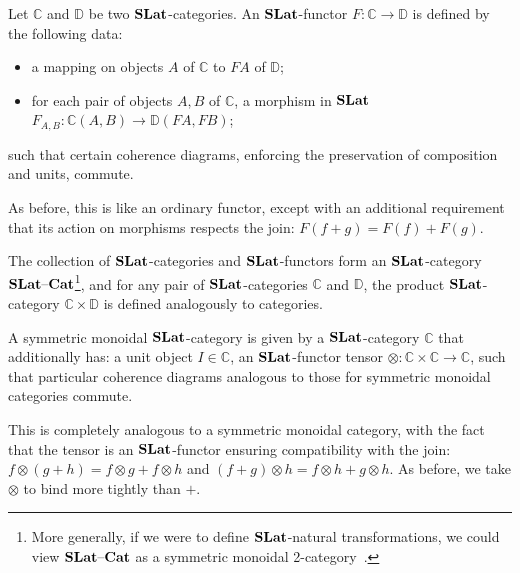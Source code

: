 \begin{definition}
	Let $\mathbb{C}$ and $\mathbb{D}$ be two $\mathbf{SLat}$-categories.
	An $\mathbf{SLat}$-functor $F\colon \mathbb{C} \to \mathbb{D}$ is defined by the following data:
	\begin{itemize}
		\item a mapping on objects $A$ of $\mathbb{C}$ to $F A$ of $\mathbb{D}$;
		\item for each pair of objects $A, B$ of $\mathbb{C}$, a morphism in $\mathbf{SLat}$ $F_{A,B}\colon \mathbb{C}(A,B) \to \mathbb{D}(FA,FB)$;
	\end{itemize}
	such that certain coherence diagrams, enforcing the preservation of composition and units, commute.
\end{definition}
As before, this is like an ordinary functor, except with an additional requirement that its action on morphisms respects the join: $F(f + g) = F(f) + F(g)$.

The collection of $\mathbf{SLat}$-categories and $\mathbf{SLat}$-functors form an $\mathbf{SLat}$-category $\mathbf{SLat}\text{--}\mathbf{Cat}$\footnote{More generally, if we were to define $\mathbf{SLat}$-natural transformations, we could view $\mathbf{SLat}\text{--}\mathbf{Cat}$ as a symmetric monoidal 2-category~\cite{Kelly2022BASICCO}.}, and for any pair of $\mathbf{SLat}$-categories $\mathbb{C}$ and $\mathbb{D}$, the product $\mathbf{SLat}$-category $\mathbb{C} \times \mathbb{D}$ is defined analogously to categories.

\begin{definition}%
	\label{def:enriched-prop}
	A symmetric monoidal $\mathbf{SLat}$-category is given by a $\mathbf{SLat}$-category $\mathbb{C}$ that additionally has: a unit object $I \in \mathbb{C}$, an $\mathbf{SLat}$-functor tensor $\otimes\colon \mathbb{C} \times \mathbb{C} \to \mathbb{C}$, such that particular coherence diagrams analogous to those for symmetric monoidal categories commute.
\end{definition}
This is completely analogous to a symmetric monoidal category, with the fact that the tensor is an $\mathbf{SLat}$-functor ensuring compatibility with the join: $f \otimes (g+h) = f \otimes g + f \otimes h $ and $ (f+g) \otimes h = f \otimes h + g \otimes h$.
As before, we take $\otimes$ to bind more tightly than $+$.

